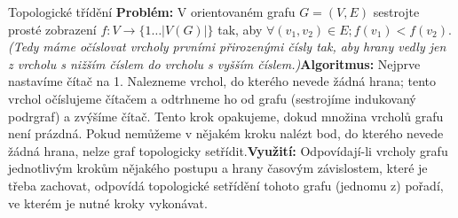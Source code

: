 \begin{algoritmusN}{Topologické třídění}
\textbf{Problém:} V orientovaném grafu $G=(V,E)$ sestrojte prosté zobrazení $f: V \to \{1\dots|V(G)|\}$ tak, aby $\forall (v_1,v_2) \in E; f(v_1)<f(v_2).$ \textit{(Tedy máme očíslovat vrcholy prvními přirozenými čísly tak, aby hrany vedly jen z vrcholu s nižším číslem do vrcholu s vyšším číslem.)}\hfil\break \textbf{Algoritmus:} Nejprve nastavíme čítač na 1. Nalezneme vrchol, do kterého nevede žádná hrana; tento vrchol očíslujeme čítačem a odtrhneme ho od grafu (sestrojíme indukovaný podrgraf) a zvýšíme čítač. Tento krok opakujeme, dokud množina vrcholů grafu není prázdná. Pokud nemůžeme v nějakém kroku nalézt bod, do kterého nevede žádná hrana, nelze graf topologicky setřídit.\hfil\break \textbf{Využití:} Odpovídají-li vrcholy grafu jednotlivým krokům nějakého postupu a hrany časovým závislostem, které je třeba zachovat, odpovídá topologické setřídění tohoto grafu (jednomu z) pořadí, ve kterém je nutné kroky vykonávat.
\end{algoritmusN}
